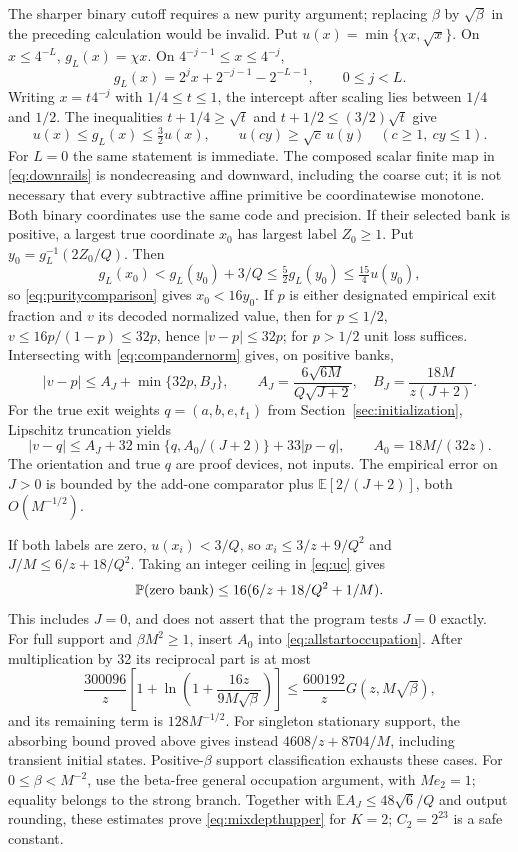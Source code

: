 \documentclass[11pt,letterpaper]{article}
\theoremstyle{definition}\newtheorem{definition}[theorem]{Definition}
\theoremstyle{remark}\newtheorem{remark}[theorem]{Remark}
\newcommand{\E}{\mathbb{E}}
\newcommand{\Prob}{\mathbb{P}}
\begin{document}
The sharper binary cutoff requires a new purity argument; replacing $\beta$ by $\sqrt\beta$ in the preceding calculation would be invalid. Put
$u(x)=\min\{\chi x,\sqrt x\}$. On $x\le4^{-L}$, $g_L(x)=\chi x$. On $4^{-j-1}\le x\le4^{-j}$,
\[
 g_L(x)=2^jx+2^{-j-1}-2^{-L-1},\qquad 0\le j<L.
\]
Writing $x=t4^{-j}$ with $1/4\le t\le1$, the intercept after scaling lies between $1/4$ and $1/2$. The inequalities
$t+1/4\ge\sqrt t$ and $t+1/2\le(3/2)\sqrt t$ give
\begin{equation}\label{eq:puritycomparison}
 u(x)\le g_L(x)\le\tfrac32u(x),\qquad
 u(cy)\ge\sqrt c\,u(y)\quad(c\ge1,\ cy\le1).
\end{equation}
For $L=0$ the same statement is immediate.
The composed scalar finite map in \eqref{eq:downrails} is nondecreasing and downward, including the coarse cut; it is not necessary that every subtractive affine primitive be coordinatewise monotone. Both binary coordinates use the same code and precision. If their selected bank is positive, a largest true coordinate $x_0$ has largest label $Z_0\ge1$. Put $y_0=g_L^{-1}(2Z_0/Q)$. Then
\[
 g_L(x_0)<g_L(y_0)+3/Q\le\tfrac52g_L(y_0)
 \le\tfrac{15}{4}u(y_0),
\]
so \eqref{eq:puritycomparison} gives $x_0<16y_0$.
If $p$ is either designated empirical exit fraction and $v$ its decoded normalized value, then for $p\le1/2$,
$v\le16p/(1-p)\le32p$, hence $|v-p|\le32p$; for $p>1/2$ unit loss suffices. Intersecting with \eqref{eq:compandernorm} gives, on positive banks,
\[
 |v-p|\le A_J+\min\{32p,B_J\},\qquad
 A_J=\frac{6\sqrt{6M}}{Q\sqrt{J+2}},\quad
 B_J=\frac{18M}{z(J+2)}.
\]
For the true exit weights $q=(a,b,e,t_1)$ from Section~\ref{sec:initialization}, Lipschitz truncation yields
\begin{equation}\label{eq:binarypureclip}
 |v-q|\le A_J+32\min\{q,A_0/(J+2)\}+33|p-q|,
 \qquad A_0=18M/(32z).
\end{equation}
The orientation and true $q$ are proof devices, not inputs. The empirical error on $J>0$ is bounded by the add-one comparator plus $\E[2/(J+2)]$, both $O(M^{-1/2})$.

If both labels are zero, $u(x_i)<3/Q$, so
$x_i\le3/z+9/Q^2$ and $J/M\le6/z+18/Q^2$. Taking an integer ceiling in \eqref{eq:uc} gives
\[
 \Prob(\hbox{zero bank})\le16(6/z+18/Q^2+1/M).
\]
This includes $J=0$, and does not assert that the program tests $J=0$ exactly.
For full support and $\beta M^2\ge1$, insert $A_0$ into \eqref{eq:allstartoccupation}. After multiplication by 32 its reciprocal part is at most
\[
 \frac{300096}{z}\left[1+\ln\left(1+\frac{16z}{9M\sqrt\beta}\right)\right]
 \le\frac{600192}{z}G(z,M\sqrt\beta),
\]
and its remaining term is $128M^{-1/2}$. For singleton stationary support, the absorbing bound proved above gives instead $4608/z+8704/M$, including transient initial states. Positive-$\beta$ support classification exhausts these cases. For $0\le\beta<M^{-2}$, use the beta-free general occupation argument, with $Me_2=1$; equality belongs to the strong branch. Together with $\E A_J\le48\sqrt6/Q$ and output rounding, these estimates prove \eqref{eq:mixdepthupper} for $K=2$; $C_2=2^{23}$ is a safe constant.
\end{document}
